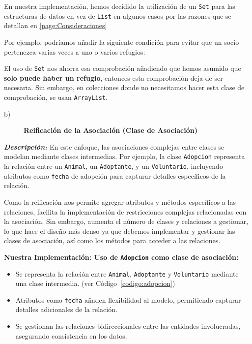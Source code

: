En nuestra implementación, hemos decidido la utilización de un \texttt{Set} para las estructuras de datos 
en vez de \texttt{List} en algunos casos por las razones que se detallan en \ref{page:Consideraciones}

Por ejemplo, podríamos añadir la siguiente condición para evitar que un socio pertenezca varias veces a uno o varios refugios:

El uso de \texttt{Set} nos ahorra esa comprobación añadiendo que hemos asumido que \textbf{solo puede haber un refugio}, entonces esta comprobación deja de ser necesaria. Sin embargo,
en colecciones donde no necesitamos hacer esta clase de comprobación, se usan \texttt{ArrayList}.
\vspace{0.45cm}

\begin{description}
    \item[b)] \textbf{Reificación de la Asociación (Clase de Asociación)}
\end{description}

\textit{\textbf{Descripción:}}  
En este enfoque, las asociaciones complejas entre clases se modelan mediante clases 
intermedias. Por ejemplo, la clase \texttt{Adopcion} representa la relación entre un 
\texttt{Animal}, un \texttt{Adoptante}, y un \texttt{Voluntario}, incluyendo atributos 
como \texttt{fecha} de adopción para capturar detalles específicos de la relación.\par
\vspace{0.15cm}
Como la reificación nos permite agregar atributos y métodos específicos a las relaciones,
facilita la implementación de restricciones complejas relacionadas con la asociación.
Sin embargo, aumenta el número de clases y relaciones a gestionar, lo que hace el diseño más denso
ya que debemos implementar y gestionar las clases de asociación, así como los métodos para 
acceder a las relaciones.\par
\vspace{0.15cm}

\textbf{Nuestra Implementación: Uso de \texttt{Adopcion} como clase de asociación:}
\begin{itemize}
    \item Se representa la relación entre \texttt{Animal}, \texttt{Adoptante} y 
    \texttt{Voluntario} mediante una clase intermedia. (ver Código~\ref{codigo:adopcion})
    \item Atributos como \texttt{fecha} añaden flexibilidad al modelo, permitiendo 
    capturar detalles adicionales de la relación.
    \item Se gestionan las relaciones bidireccionales entre las entidades involucradas, 
    asegurando consistencia en los datos.
\end{itemize}




